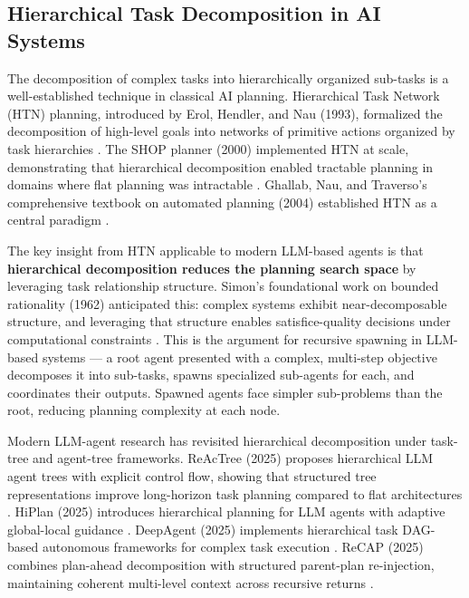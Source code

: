\subsection{Hierarchical Task Decomposition in AI Systems}
\label{sec:htd}

The decomposition of complex tasks into hierarchically organized sub-tasks is a well-established technique in classical AI planning. Hierarchical Task Network (HTN) planning, introduced by Erol, Hendler, and Nau (1993), formalized the decomposition of high-level goals into networks of primitive actions organized by task hierarchies \cite{htn1993}. The SHOP planner (2000) implemented HTN at scale, demonstrating that hierarchical decomposition enabled tractable planning in domains where flat planning was intractable \cite{htn2000}. Ghallab, Nau, and Traverso's comprehensive textbook on automated planning (2004) established HTN as a central paradigm \cite{erpl}.

The key insight from HTN applicable to modern LLM-based agents is that \textbf{hierarchical decomposition reduces the planning search space} by leveraging task relationship structure. Simon's foundational work on bounded rationality (1962) anticipated this: complex systems exhibit near-decomposable structure, and leveraging that structure enables satisfice-quality decisions under computational constraints \cite{simon}. This is the argument for recursive spawning in LLM-based systems — a root agent presented with a complex, multi-step objective decomposes it into sub-tasks, spawns specialized sub-agents for each, and coordinates their outputs. Spawned agents face simpler sub-problems than the root, reducing planning complexity at each node.

Modern LLM-agent research has revisited hierarchical decomposition under task-tree and agent-tree frameworks. ReAcTree (2025) proposes hierarchical LLM agent trees with explicit control flow, showing that structured tree representations improve long-horizon task planning compared to flat architectures \cite{reactree2025}. HiPlan (2025) introduces hierarchical planning for LLM agents with adaptive global-local guidance \cite{hiplan2025}. DeepAgent (2025) implements hierarchical task DAG-based autonomous frameworks for complex task execution \cite{deepagent2025}. ReCAP (2025) combines plan-ahead decomposition with structured parent-plan re-injection, maintaining coherent multi-level context across recursive returns \cite{recap2025}.

